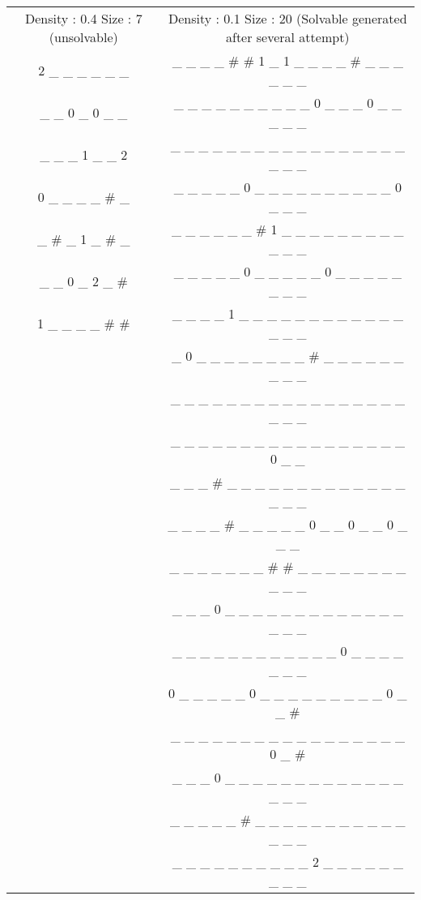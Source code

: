 \documentclass[a4paper]{article}
\begin{document}
\begin{tabular}{c c}
Density : 0.4 Size : 7 (unsolvable) & Density : 0.1 Size : 20 (Solvable generated after several attempt) \\
 2 \_ \_ \_ \_ \_ \_ 			& \_ \_ \_ \_ \# \# 1 \_ 1 \_ \_ \_ \_ \# \_ \_ \_ \_ \_ \_ \\
\_ \_  0 \_  0 \_ \_ 			& \_ \_ \_ \_ \_ \_ \_ \_ \_ \_ 0 \_ \_ \_ 0 \_ \_ \_ \_ \_ \\
\_ \_ \_  1 \_ \_  2 			& \_ \_ \_ \_ \_ \_ \_ \_ \_ \_ \_ \_ \_ \_ \_ \_ \_ \_ \_ \_ \\
 0 \_ \_ \_ \_ \# \_ 			& \_ \_ \_ \_ \_ 0 \_ \_ \_ \_ \_ \_ \_ \_ \_ \_ 0 \_ \_ \_ \\
\_ \# \_  1 \_ \# \_ 			& \_ \_ \_ \_ \_ \_ \# 1 \_ \_ \_ \_ \_ \_ \_ \_ \_ \_ \_ \_ \\
\_ \_  0 \_  2 \_ \# 			& \_ \_ \_ \_ \_ 0 \_ \_ \_ \_ \_ 0 \_ \_ \_ \_ \_ \_ \_ \_ \\
 1 \_ \_ \_ \_ \# \# 			& \_ \_ \_ \_ 1 \_ \_ \_ \_ \_ \_ \_ \_ \_ \_ \_ \_ \_ \_ \_ \\
 								& \_ 0 \_ \_ \_ \_ \_ \_ \_ \_ \# \_ \_ \_ \_ \_ \_ \_ \_ \_ \\
 								& \_ \_ \_ \_ \_ \_ \_ \_ \_ \_ \_ \_ \_ \_ \_ \_ \_ \_ \_ \_ \\
 								& \_ \_ \_ \_ \_ \_ \_ \_ \_ \_ \_ \_ \_ \_ \_ \_ \_ 0 \_ \_ \\
 								& \_ \_ \_ \# \_ \_ \_ \_ \_ \_ \_ \_ \_ \_ \_ \_ \_ \_ \_ \_ \\
 								& \_ \_ \_ \_ \# \_ \_ \_ \_ \_ 0 \_ \_ 0 \_ \_ 0 \_ \_ \_ \\
 								& \_ \_ \_ \_ \_ \_ \_ \# \# \_ \_ \_ \_ \_ \_ \_ \_ \_ \_ \_ \\
 								& \_ \_ \_ 0 \_ \_ \_ \_ \_ \_ \_ \_ \_ \_ \_ \_ \_ \_ \_ \_ \\
 								& \_ \_ \_ \_ \_ \_ \_ \_ \_ \_ \_ \_ 0 \_ \_ \_ \_ \_ \_ \_ \\
 								& 0 \_ \_ \_ \_ \_ 0 \_ \_ \_ \_ \_ \_ \_ \_ \_ 0 \_ \_ \# \\
 								& \_ \_ \_ \_ \_ \_ \_ \_ \_ \_ \_ \_ \_ \_ \_ \_ \_ 0 \_ \# \\
 								& \_ \_ \_ 0 \_ \_ \_ \_ \_ \_ \_ \_ \_ \_ \_ \_ \_ \_ \_ \_ \\
 								& \_ \_ \_ \_ \_ \# \_ \_ \_ \_ \_ \_ \_ \_ \_ \_ \_ \_ \_ \_ \\
 								& \_ \_ \_ \_ \_ \_ \_ \_ \_ \_ 2 \_ \_ \_ \_ \_ \_ \_ \_ \_ \\

\end{tabular}
\end{document}
